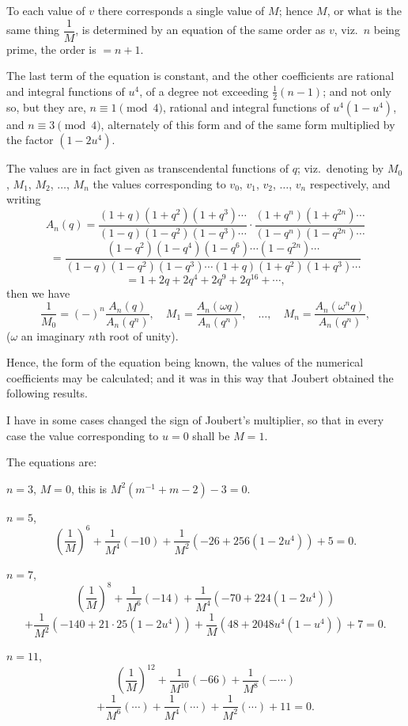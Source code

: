 \documentclass[11pt,a4paper]{article}
\theoremstyle{plain}
\begin{document}
To each value of $v$ there corresponds a single value of $M$; hence $M$, or what is the same thing $\dfrac{1}{M}$, is determined by an equation of the same order as $v$, viz.\ $n$ being prime, the order is $= n + 1$.

The last term of the equation is constant, and the other coefficients are rational and integral functions of $u^4$, of a degree not exceeding $\frac{1}{2}(n - 1)$; and not only so, but they are, $n \equiv 1 \pmod{4}$, rational and integral functions of $u^4(1 - u^4)$, and $n \equiv 3 \pmod{4}$, alternately of this form and of the same form multiplied by the factor $(1 - 2u^4)$.

The values are in fact given as transcendental functions of $q$; viz.\ denoting by $M_0$, $M_1$, $M_2$, $\ldots$, $M_n$ the values corresponding to $v_0$, $v_1$, $v_2$, $\ldots$, $v_n$ respectively, and writing
\[
A_n(q) = \frac{(1 + q)(1 + q^2)(1 + q^3)\cdots}{(1 - q)(1 - q^2)(1 - q^3)\cdots} \cdot \frac{(1 + q^n)(1 + q^{2n})\cdots}{(1 - q^n)(1 - q^{2n})\cdots}
\]
\[
= \frac{(1 - q^2)(1 - q^4)(1 - q^6)\cdots(1 - q^{2n})\cdots}{(1 - q)(1 - q^2)(1 - q^3)\cdots(1 + q)(1 + q^2)(1 + q^3)\cdots}
\]
\[
= 1 + 2q + 2q^4 + 2q^9 + 2q^{16} + \cdots,
\]
then we have
\[
\frac{1}{M_0} = (-)^n \frac{A_n(q)}{A_n(q^n)}, \quad
M_1 = \frac{A_n(\omega q)}{A_n(q^n)}, \quad \ldots, \quad
M_n = \frac{A_n(\omega^n q)}{A_n(q^n)},
\]
($\omega$ an imaginary $n$th root of unity).

Hence, the form of the equation being known, the values of the numerical coefficients may be calculated; and it was in this way that Joubert obtained the following results.

I have in some cases changed the sign of Joubert's multiplier, so that in every case the value corresponding to $u = 0$ shall be $M = 1$.

The equations are:

$n = 3$, $M = 0$, this is $M^2(m^{-1} + m - 2) - 3 = 0$.

\medskip
$n = 5$,
\[
\left(\frac{1}{M}\right)^6 + \frac{1}{M^4}(-10) + \frac{1}{M^2}(-26 + 256(1 - 2u^4)) + 5 = 0.
\]

\medskip
$n = 7$,
\[
\left(\frac{1}{M}\right)^8 + \frac{1}{M^6}(-14) + \frac{1}{M^4}(-70 + 224(1 - 2u^4))
\]
\[
+ \frac{1}{M^2}(-140 + 21 \cdot 25(1 - 2u^4)) + \frac{1}{M}(48 + 2048u^4(1 - u^4)) + 7 = 0.
\]

\medskip
$n = 11$,
\[
\left(\frac{1}{M}\right)^{12} + \frac{1}{M^{10}}(-66) + \frac{1}{M^8}(-\cdots)
\]
\[
+ \frac{1}{M^6}(\cdots) + \frac{1}{M^4}(\cdots) + \frac{1}{M^2}(\cdots) + 11 = 0.
\]
\end{document}
